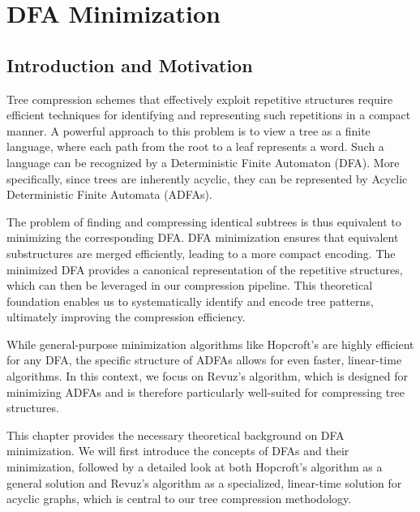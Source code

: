 \chapter{DFA Minimization} \label{chp:hopcroft}

\section{Introduction and Motivation}
Tree compression schemes that effectively exploit repetitive structures require efficient techniques for identifying and representing such repetitions in a compact manner. A powerful approach to this problem is to view a tree as a finite language, where each path from the root to a leaf represents a word. Such a language can be recognized by a Deterministic Finite Automaton (DFA). More specifically, since trees are inherently acyclic, they can be represented by Acyclic Deterministic Finite Automata (ADFAs).

The problem of finding and compressing identical subtrees is thus equivalent to minimizing the corresponding DFA. DFA minimization ensures that equivalent substructures are merged efficiently, leading to a more compact encoding. The minimized DFA provides a canonical representation of the repetitive structures, which can then be leveraged in our compression pipeline. This theoretical foundation enables us to systematically identify and encode tree patterns, ultimately improving the compression efficiency.

While general-purpose minimization algorithms like Hopcroft's are highly efficient for any DFA, the specific structure of ADFAs allows for even faster, linear-time algorithms. In this context, we focus on Revuz's algorithm, which is designed for minimizing ADFAs and is therefore particularly well-suited for compressing tree structures.

This chapter provides the necessary theoretical background on DFA minimization. We will first introduce the concepts of DFAs and their minimization, followed by a detailed look at both Hopcroft's algorithm as a general solution and Revuz's algorithm as a specialized, linear-time solution for acyclic graphs, which is central to our tree compression methodology.


